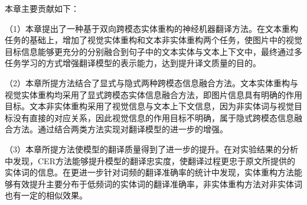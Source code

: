 本章主要贡献如下：

（1）本章提出了一种基于双向跨模态实体重构的神经机器翻译方法。在文本重构任务的基础上，增加了视觉实体重构和文本非实体重构两个任务，使图片中的视觉目标信息能够更充分的分别融合到句子中的文本实体与文本上下文中，最终通过多任务学习的方式增强翻译模型的表示能力，达到提升译文质量的目的。

（2）本章所提方法结合了显式与隐式两种跨模态信息融合方法。文本实体重构与视觉实体重构均采用了显式跨模态实体信息融合方法，即图片信息具有明确的作用目标。文本非实体重构采用了视觉信息与文本上下文信息，因为非实体词与视觉目标没有直接的对应关系，因此视觉信息的作用目标不明确，属于隐式跨模态信息融合方法。通过结合两类方法实现对翻译模型的进一步的增强。

（3）本章所提方法使模型的翻译质量得到了进一步的提升。在对实验结果的分析中发现，CER方法能够提升模型的翻译忠实度，使翻译过程更忠于原文所提供的实体词的信息。在更进一步针对词频的翻译准确率的统计中发现，实体重构方法能够有效提升主要分布于低频词的实体词的翻译准确率，非实体重构方法对非实体词也有一定的相似效果。